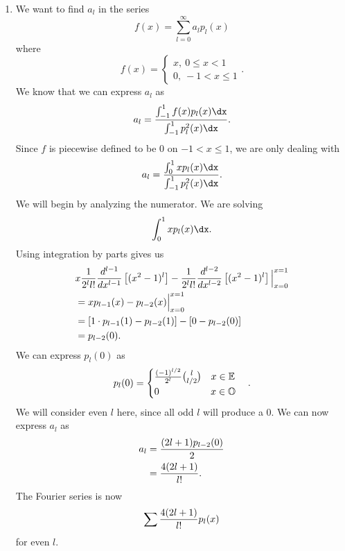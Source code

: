 \documentclass{hw}
\begin{document}
\begin{enumerate}
\newpage
\item We want to find $a_{l}$ in the series
\[
f(x) = \sum_{l=0}^{\infty}a_{l}p_{l}(x)
\]
where
\[
f(x)=
\begin{cases}
x,\ 0\leq x < 1\\
0,\ -1 < x \leq 1
\end{cases}.
\]
We know that we can express $a_{l}$ as
\[
a_{l} = {%
\int_{-1}^{1}f(x)p_{l}(x)\dx%
\over%
\int_{-1}^{1}p_{l}^{2}(x)\dx%
}.
\]
Since $f$ is piecewise defined to be $0$ on $-1 < x \leq 1$, we are only dealing with
\[
a_{l} = {%
\int_{0}^{1}xp_{l}(x)\dx%
\over%
\int_{-1}^{1}p_{l}^{2}(x)\dx%
}.
\]
We will begin by analyzing the numerator. We are solving
\[
\int_{0}^{1}xp_{l}(x)\dx.
\]
Using integration by parts gives us
\begin{align*}
&x{1\over2^ll!}{d^{l-1}\over dx^{l-1}}\left[(x^2-1)^l\right]-
{1\over2^ll!}{d^{l-2}\over dx^{l-2}}\left[(x^2-1)^l\right]\Big|_{x=0}^{x=1}\\
&= xp_{l-1}(x)-p_{l-2}(x)\Big|_{x=0}^{x=1}\\
&= \left[1\cdot p_{l-1}(1) - p_{l-2}(1)\right] -\left[0-p_{l-2}(0)\right]\\
&= p_{l-2}(0).
\end{align*}
We can express $p_{l}(0)$ as
\[
p_{l}(0) =
\begin{cases}
{(-1)^{l/2}\over2^l}{l\choose l/2}\quad x\in\mathbb{E}\\
0\qquad\qquad\quad\ x\in\mathbb{O}
\end{cases}.
\]
We will consider even $l$ here, since all odd $l$ will produce a 0. We can now express $a_{l}$ as
\begin{align*}
a_{l} &= {(2l+1)p_{l-2}(0)\over2}\\
&= {4(2l+1)\over l!}.
\end{align*}
The Fourier series is now
\[
\sum{4(2l+1)\over l!}p_{l}(x)
\]
for even $l$.
\end{enumerate}
\end{document}
